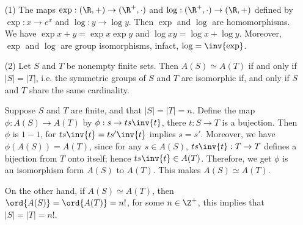 \begin{example}
    \begin{enumerate}
        \item[(1)] The maps $\exp: (\R,+) \rightarrow (\R^+, \cdot)$ and
            $\log: (\R^+, \cdot) \rightarrow (\R,+)$ defined by $\exp:x
            \rightarrow e^x$ and $\log:y \rightarrow \log{y}$. Then $\exp$ and
            $\log$ are homomorphisms. We have $\exp{x+y}=\exp{x}\exp{y}$ and
            $\log{xy}=\log{x}+\log{y}$. Moreover, $\exp$ and  $\log$ are group
            isomorphisms, infact, $\log=\inv{\exp}$.

        \item[(2)] Let $S$ and  $T$ be nonempty finite sets. Then  $A(S) \simeq
            A(T)$ if and only if $|S|=|T|$, i.e. the symmetric groups of  $S$
            and  $T$ are isomorphic if, and only if  $S$ and  $T$ share the same
            cardinality.

            Suppose $S$ and  $T$ are finite, and that  $|S|=|T|=n$. Define  the
            map  $\phi:A(S) \rightarrow A(T)$ by $\phi:s \rightarrow ts\inv{t}$,
            there $t:S \rightarrow T$ is a bujection. Then $\phi$ is $1-1$, for
             $ts\inv{t}=ts'\inv{t}$ implies $s=s'$. Moreover, we have
             $\phi(A(S))=A(T)$, since for any $s \in A(S)$, $ts\inv{t}:T
             \rightarrow T$ defines a bijection from $T$ onto itself; hence
             $ts\inv{t} \in A(T)$. Therefore, we get $\phi$ is an isomorphism
             form  $A(S)$ to $A(T)$. This makes $A(S) \simeq A(T)$.

            On the other hand, if  $A(S) \simeq A(T)$, then $\ord{A(S)}=
            \ord{A(T)}=n!$, for some $n \in \Z^+$, this implies that
            $|S|=|T|=n!$.
    \end{enumerate}
\end{example}

